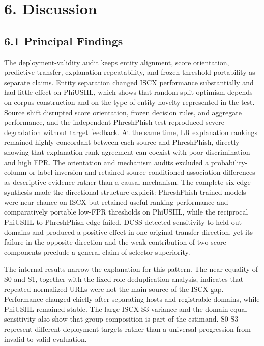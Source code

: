 \documentclass[
  10pt,
]{article}
\begin{document}
\section{6. Discussion}\label{discussion}

\subsection{6.1 Principal Findings}\label{principal-findings}

The deployment-validity audit keeps entity alignment, score orientation,
predictive transfer, explanation repeatability, and frozen-threshold
portability as separate claims. Entity separation changed ISCX
performance substantially and had little effect on PhiUSIIL, which shows
that random-split optimism depends on corpus construction and on the
type of entity novelty represented in the test. Source shift disrupted
score orientation, frozen decision rules, and aggregate performance, and
the independent PhreshPhish test reproduced severe degradation without
target feedback. At the same time, LR explanation rankings remained
highly concordant between each source and PhreshPhish, directly showing
that explanation-rank agreement can coexist with poor discrimination and
high FPR. The orientation and mechanism audits excluded a
probability-column or label inversion and retained source-conditioned
association differences as descriptive evidence rather than a causal
mechanism. The complete six-edge synthesis made the directional
structure explicit: PhreshPhish-trained models were near chance on ISCX
but retained useful ranking performance and comparatively portable
low-FPR thresholds on PhiUSIIL, while the reciprocal
PhiUSIIL-to-PhreshPhish edge failed. DCSS detected sensitivity to
held-out domains and produced a positive effect in one original transfer
direction, yet its failure in the opposite direction and the weak
contribution of two score components preclude a general claim of
selector superiority.

The internal results narrow the explanation for this pattern. The
near-equality of S0 and S1, together with the fixed-role deduplication
analysis, indicates that repeated normalized URLs were not the main
source of the ISCX gap. Performance changed chiefly after separating
hosts and registrable domains, while PhiUSIIL remained stable. The large
ISCX S3 variance and the domain-equal sensitivity also show that group
composition is part of the estimand. S0-S3 represent different
deployment targets rather than a universal progression from invalid to
valid evaluation.
\end{document}
